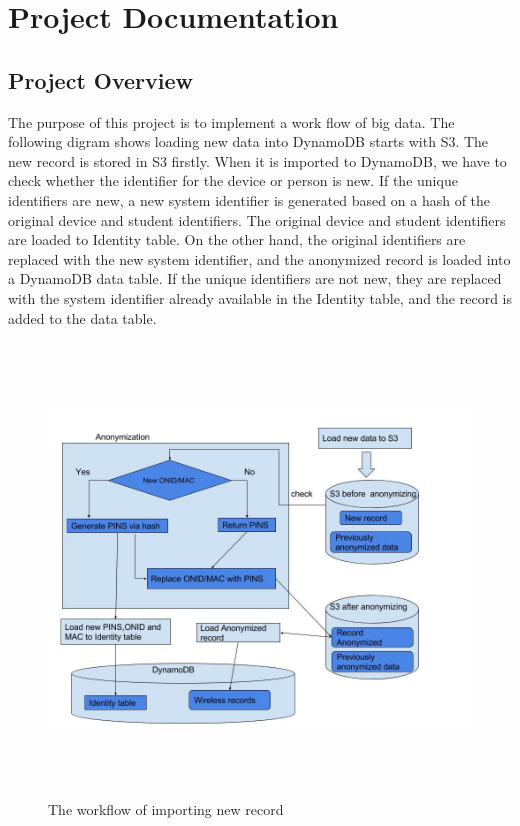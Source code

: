 \section{Project Documentation}
\subsection{Project Overview}
\noindent The purpose of this project is to implement a work flow of big data. The following digram shows loading new data into DynamoDB starts with S3. The new record is stored in S3 firstly. When it is imported to DynamoDB, we have to check whether the identifier for the device or person is new. If the unique identifiers are new, a new system identifier is generated based on a hash of the original device and student identifiers. The original device and student identifiers are loaded to Identity table. On the other hand, the original identifiers are replaced with the new system identifier, and the anonymized record is loaded into a DynamoDB data table. If the unique identifiers are not new, they are replaced with the system identifier already available in the Identity table, and the record is added to the data table.
\begin{figure}[H]
	\includegraphics[width=17cm, height=12cm]{Pictures/workflow.jpg}
    \centering
    \caption{\label{fig:2}The workflow of importing new record}
\end{figure}

